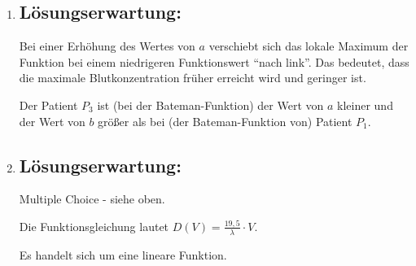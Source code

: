 \begin{langesbeispiel}
{\begin{enumerate}
$c_1'(t)=19,5\cdot (-0,4\cdot e^{-0,4\cdot t}+1,3\cdot e^{-1,3\cdot t})=0$

$t\approx 1,31$\, Stunden

$c_1''(1,31)\approx -4,15<0$\leer

Mögliche Begründungen:

Für die Berechnung des Zeitpunkts der (lokalen) maximalen Blutkonzentration muss die Gleichung $c'(t)=0$ nach $t$ gelöst werden. Der Parameter $d$ fällt bei dieser Berechnung weg und beeinflusst somit nur die Höhe der maximalen Blutkonzentration zum ermittelten Zeitpunkt.

oder:

$c'(t)=d\cdot (-a\cdot e^{-a\cdot t}+b\cdot e^{-b\cdot t})=0 \Rightarrow t=\frac{\ln(a)-\ln(b)}{a-b} \Rightarrow$ Der Parameter $d$ tritt in dieser Formel nicht auf. Der Zeitpunkt der maximalen Blutkonzentration $t$ ist somit von $d$ unabhängig.
	
	\item \subsection{Lösungserwartung:}
	
	Bei einer Erhöhung des Wertes von $a$ verschiebt sich das lokale Maximum der Funktion bei einem niedrigeren Funktionswert "`nach link"'. Das bedeutet, dass die maximale Blutkonzentration früher erreicht wird und geringer ist.\leer
	
	Der Patient $P_3$ ist (bei der Bateman-Funktion) der Wert von $a$ kleiner und der Wert von $b$ größer als bei (der Bateman-Funktion von) Patient $P_1$.

\item \subsection{Lösungserwartung:}
	
	Multiple Choice - siehe oben.\leer
	
	Die Funktionsgleichung lautet $D(V)=\frac{19,5}{\lambda}\cdot V$.
	
	Es handelt sich um eine lineare Funktion.
\end{enumerate}}
		\end{langesbeispiel}